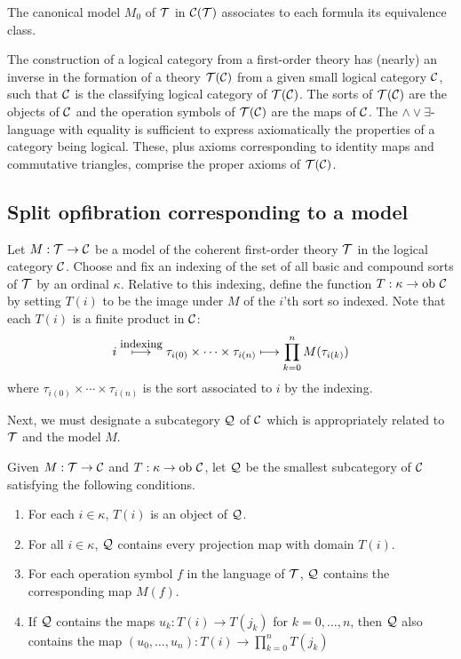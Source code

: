 The canonical model $M_0$ of $\cal T$ in ${\bf \cal C} (\cal T)$ associates 
to each formula its equivalence class.

The construction of a logical category from a first-order theory has 
(nearly) an inverse in the formation of a theory $\cal T ({\bf \cal C})$ 
from a given small logical category ${\bf \cal C}$, such that ${\bf \cal C}$ is the 
classifying logical category of $\cal T ({\bf \cal C})$. The sorts of $\cal 
T ({\bf \cal C})$ are the objects of ${\bf \cal C}$ and the operation symbols of 
$\cal T ({\bf \cal C})$ are the maps of ${\bf \cal C}$. The $\wedge \vee 
\exists$-language with equality is sufficient to express 
axiomatically the properties of a category being logical. These, plus 
axioms corresponding to identity maps and commutative triangles, 
comprise the proper axioms of $\cal T ({\bf \cal C})$. 

\subsection{Split opfibration corresponding to a model} 
\label{MODEL_SOF}
Let $M : \cal T \to {\bf \cal C}$ be a model of the coherent first-order 
theory $\cal T$ in the logical category ${\bf \cal C}$. Choose and fix an 
indexing of the set of all basic and compound sorts of $\cal T$ by an 
ordinal $\kappa$. Relative to this indexing, define the function $T : 
\kappa \to \mbox{ob } {\bf \cal C}$ by setting $T(i)$ to be the image under 
$M$ of the $i$'th sort so indexed. Note that each $T(i)$ is a finite 
product in ${\bf \cal C}$:
$$
i \stackrel{\mbox{\small indexing}}{\longmapsto} \tau_{i(0)} \times 
\cdots \times \tau_{i(n)} \longmapsto \prod_{k=0}^n M(\tau_{i(k)}) $$
where $\tau_{i(0)} \times \cdots \times \tau_{i(n)}$ is the sort 
associated to $i$ by the indexing.

Next, we must designate a subcategory ${\bf \cal Q}$ of ${\bf \cal C}$ which is 
appropriately related to $\cal T$ and the model $M$. 

\begin{DEFN}
Given $M : {\cal T} \to {{\bf \cal C}}$ and $T : \kappa \to \mbox{ob } {{\bf \cal C}}$, let ${\bf \cal Q}$ be the smallest subcategory of ${\bf \cal C}$ satisfying 
the following conditions.
\begin{enumerate}
\item For each $i \in \kappa$, $T(i)$ is an object of ${\bf \cal Q}$. 

\item For all $i \in \kappa$, ${\bf \cal Q}$ contains every projection map 
with domain $T(i)$.

\item For each operation symbol $f$ in the language of $\cal T$, ${\bf \cal Q}$ contains the corresponding map $M(f)$. 

\item If ${\bf \cal Q}$ contains the maps $u_k : T(i) \to T(j_k)$ for 
$k=0,\ldots,n$, then ${\bf \cal Q}$ also contains the map $(u_0,\ldots,u_n) 
: T(i) \to \prod_{k=0}^n T(j_k)$
\end{enumerate}
\end{DEFN}

